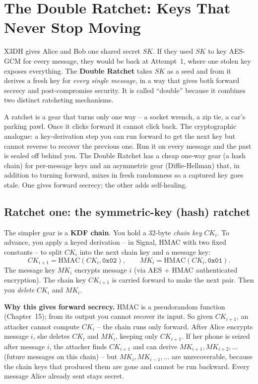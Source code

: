 \section{The Double Ratchet: Keys That Never Stop Moving}
\label{ch27:double-ratchet}

X3DH gives Alice and Bob one shared secret $SK$. If they used $SK$ to key AES-GCM for every message, they would be back at Attempt~1, where one stolen key exposes everything. The \textbf{Double Ratchet} takes $SK$ as a seed and from it derives a fresh key for \emph{every single message}, in a way that gives both forward secrecy and post-compromise security. It is called ``double'' because it combines two distinct ratcheting mechanisms.

\begin{intuitionbox}
A ratchet is a gear that turns only one way -- a socket wrench, a zip tie, a car's parking pawl. Once it clicks forward it cannot click back. The cryptographic analogue: a key-derivation step you can run forward to get the next key but cannot reverse to recover the previous one. Run it on every message and the past is sealed off behind you. The Double Ratchet has a cheap one-way gear (a hash chain) for per-message keys and an asymmetric gear (Diffie-Hellman) that, in addition to turning forward, mixes in fresh randomness so a captured key goes stale. One gives forward secrecy; the other adds self-healing.
\end{intuitionbox}

\subsection{Ratchet one: the symmetric-key (hash) ratchet}
\label{ch27:symmetric-ratchet}

The simpler gear is a \textbf{KDF chain}. You hold a 32-byte \emph{chain key} $CK_i$. To advance, you apply a keyed derivation -- in Signal, HMAC with two fixed constants -- to split $CK_i$ into the next chain key and a message key:
\[
CK_{i+1} = \mathrm{HMAC}(CK_i, \texttt{0x02}), \qquad
MK_i = \mathrm{HMAC}(CK_i, \texttt{0x01}).
\]
The message key $MK_i$ encrypts message $i$ (via AES + HMAC authenticated encryption). The chain key $CK_{i+1}$ is carried forward to make the next pair. Then you \emph{delete} $CK_i$ and $MK_i$.

\begin{whybox}
\textbf{Why this gives forward secrecy.} HMAC is a pseudorandom function (Chapter~15); from its output you cannot recover its input. So given $CK_{i+1}$, an attacker cannot compute $CK_i$ -- the chain runs only forward. After Alice encrypts message $i$, she deletes $CK_i$ and $MK_i$, keeping only $CK_{i+1}$. If her phone is seized after message $i$, the attacker finds $CK_{i+1}$ and can derive $MK_{i+1}, MK_{i+2}, \dots$ (future messages on this chain) -- but $MK_i, MK_{i-1}, \dots$ are unrecoverable, because the chain keys that produced them are gone and cannot be run backward. Every message Alice already sent stays secret.
\end{whybox}

